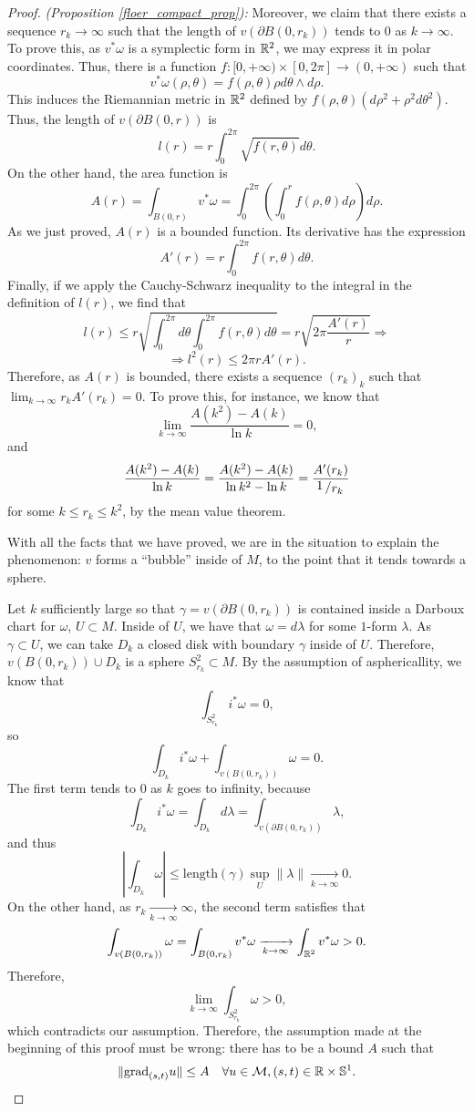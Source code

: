 \begin{proof} {\it (Proposition \ref{floer_compact_prop}):}
Moreover, we claim that there exists a sequence $r_k \rightarrow \infty$ such that the length of $v(\partial B(0,r_k))$ tends to $0$ as $k \rightarrow \infty$. To prove this, as $v^{\ast} \omega$ is a symplectic form in $\mathbb{R}^2$, we may express it in polar coordinates. Thus, there is a function $f : [0,+\infty) \times [0,2\pi] \rightarrow (0,+\infty)$ such that
\[v^{\ast} \omega(\rho,\theta) = f(\rho,\theta) \rho d \theta \wedge d \rho .\]
This induces the Riemannian metric in $\mathbb{R}^2$ defined by $f(\rho,\theta)(d\rho^2 + \rho^2 d\theta^2)$. Thus, the length of $v(\partial B(0,r))$ is
\[l(r) = r \int_0^{2\pi} \sqrt{f(r,\theta)} d \theta .\]
On the other hand, the area function is
\[A(r) = \int_{B(0,r)} v^{\ast} \omega = \int_0^{2\pi} \left( \int_0^r f(\rho,\theta) d\rho \right) d\rho .\]
As we just proved, $A(r)$ is a bounded function. Its derivative has the expression
\[A'(r) = r \int_0^{2\pi} f(r,\theta) d\theta .\]
Finally, if we apply the Cauchy-Schwarz inequality to the integral in the definition of $l(r)$, we find that
\[l(r) \leq r \sqrt{\int_0^{2\pi} d\theta \int_0^{2\pi} f(r,\theta) d\theta} = r \sqrt{2\pi \frac{A'(r)}{r}}  \Rightarrow\]
\[\Rightarrow l^2(r) \leq 2\pi r A'(r) .\]
Therefore, as $A(r)$ is bounded, there exists a sequence $(r_k)_k$ such that $\displaystyle\lim_{k\rightarrow \infty} r_k A'(r_k) = 0$. To prove this, for instance, we know that
\[\lim_{k \rightarrow \infty} \frac{A(k^2) - A(k)}{\ln k} = 0 ,\]
and
\[\frac{A(k^2)-A(k)}{\ln k} = \frac{A(k^2)-A(k)}{\ln k^2 - \ln k} = \frac{A'(r_k)}{\quocient{1}{r_k}}\]
for some $k \leq r_k \leq k^2$, by the mean value theorem.

With all the facts that we have proved, we are in the situation to explain the phenomenon: $v$ forms a “bubble” inside of $M$, to the point that it tends towards a sphere.

Let $k$ sufficiently large so that $\gamma = v(\partial B(0,r_k))$ is contained inside a Darboux chart for $\omega$, $U \subset M$. Inside of $U$, we have that $\omega = d\lambda$ for some $1$-form $\lambda$. As $\gamma \subset U$, we can take $D_k$ a closed disk with boundary $\gamma$ inside of $U$. Therefore, $v(B(0,r_k)) \cup D_k$ is a sphere $S_{r_k}^2 \subset M$. By the assumption of asphericallity, we know that
\[\int_{S_{r_k}^2} i^{\ast} \omega = 0 ,\]
so
\[\int_{D_k} i^{\ast} \omega + \int_{v(B(0,r_k))} \omega = 0 .\]
The first term tends to $0$ as $k$ goes to infinity, because
\[\int_{D_k} i^{\ast} \omega = \int_{D_k} d\lambda = \int_{v(\partial B(0,r_k))} \lambda ,\]
and thus
\[\left| \int_{D_k} \omega \right| \leq \text{length}(\gamma) \sup_U\|\lambda\| \xrightarrow[k \rightarrow \infty]{} 0 .\]
On the other hand, as $r_k \xrightarrow[k \rightarrow \infty]{} \infty$, the second term satisfies that
\[\int_{v(B(0,r_k))} \omega = \int_{B(0,r_k)} v^{\ast} \omega \xrightarrow[k \rightarrow \infty]{} \int_{\mathbb{R}^2} v^{\ast} \omega > 0 .\]
Therefore,
\[\lim_{k \rightarrow \infty} \int_{S_{r_k}^2} \omega > 0,\]
which contradicts our assumption. Therefore, the assumption made at the beginning of this proof must be wrong: there has to be a bound $A$ such that
\[\|\grad_{(s,t)}u\| \leq A \ \ \ \forall u \in \mathcal{M}, (s,t) \in \R \times \con{S}^1 .\]
\end{proof}
